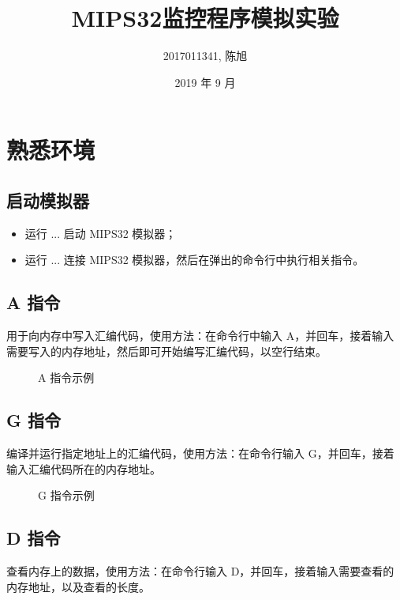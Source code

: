 \documentclass[a4paper]{article}
\title{MIPS32监控程序模拟实验}
\author{2017011341, 陈旭}
\date{2019 年 9 月}
\begin{document}
\maketitle
\newpage
\section{熟悉环境}

    \subsection{启动模拟器}

    \begin{itemize}
        \item 运行 ... 启动 MIPS32 模拟器；
        \item 运行 ... 连接 MIPS32 模拟器，然后在弹出的命令行中执行相关指令。
    \end{itemize}

    \subsection{A 指令}

        用于向内存中写入汇编代码，使用方法：在命令行中输入 A，并回车，接着输入需要写入的内存地址，然后即可开始编写汇编代码，以空行结束。

        \begin{figure}[H]
            \centering
            \caption{A 指令示例}
        \end{figure}

    \subsection{G 指令}

        编译并运行指定地址上的汇编代码，使用方法：在命令行输入 G，并回车，接着输入汇编代码所在的内存地址。

        \begin{figure}[H]
            \centering
            \caption{G 指令示例}
        \end{figure}

    \subsection{D 指令}

        查看内存上的数据，使用方法：在命令行输入 D，并回车，接着输入需要查看的内存地址，以及查看的长度。
\end{document}
